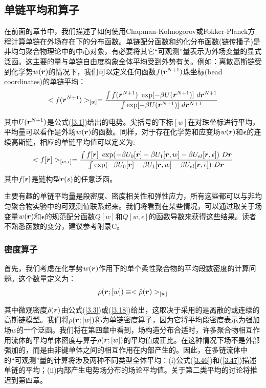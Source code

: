 \subsection{单链平均和算子}
\begin{center}
\author{何志娟}
\end{center}

在前面的章节中，我们描述了如何使用Chapman-Kolmogorov或Fokker-Planck方程计算单链在外场存在下的分布函数。单链配分函数和约化分布函数(链传播子)是非均匀聚合物理论中的中心对象，有必要将其它“可观测”量表示为外场变量的显式泛函。这主要的量与单链自由度构象全体平均受到外势有关。例如：离散高斯链受到化学势$w (\bm{r})$的情况下，我们可以定义任何函数$f(\bm{r}^{N+1})$珠坐标(bead coordinates)的单链平均：
\begin{equation}\label{3.46}
<f(\bm{r}^{N+1})>_{[w]}= \frac{\int  f(\bm{r}^{N+1})~\exp[-\beta U(\bm{r}^{N+1})]~d \bm{r}^{N+1}}{\int \exp[-\beta U(\bm{r}^{N+1})]~d\bm{r}^{N+1}}
\end{equation}

其中$U(\bm{r}^{N+1})$是公式(\ref{3.1})给出的电势。尖括号的下标$[w]$在对珠坐标进行平均，平均量可以看作是外场$w(\bm{r})$的函数。同样，对于存在化学势和应变场$w(\bm{r})$和$\mathbf{\epsilon}$的连续高斯链，相应的单链平均值可以定义为:
\begin{equation}\label{3.47}
<f[\bm{r}]>_{[w ,\epsilon]}=\frac{\int f[\bm{r}]~\exp(-\beta U_{0}[\bm{r}]-\beta U_{1}[\bm{r},w]-\beta U_{el}[\bm{r},\epsilon])~D\bm{r}}{\int \exp(-\beta U_{0}[\bm{r}]-\beta U_{1}[\bm{r},w]-\beta U_{el}[\bm{r},\epsilon])~D\bm{r}}
\end{equation}
其中$f[\bm{r}]$是链构型$\bm{r}(s)$的任意泛函。

主要有趣的单链平均量是段密度、密度相关性和弹性应力，所有这些都可以与非均匀聚合物实验中的可观测值联系起来。我们将看到在某些情况，可以通过取关于场变量$w(\bm{r})$和$\mathbf{\epsilon}$的规范配分函数$Q[w]$和$Q[w,\epsilon]$的函数导数来获得这些结果。读者不熟悉函数的变分，建议参考附录C。
\subsubsection{密度算子}
首先，我们考虑在化学势$w(\bm{r})$作用下的单个柔性聚合物的平均段数密度的计算问题。这个数量定义为：
\begin{equation}\label{3.48}
\rho(\bm{r};[w])\equiv<\tilde{\rho}(\bm{r})>_{[w]}
\end{equation}

其中微观密度$\tilde{\rho}(\bm{r})$由公式(\ref{3.3})或(\ref{3.18})给出，这取决于采用的是离散的或连续的高斯链模型。我们将$\rho(\bm{r};[w])$称为单链密度算子，因为它将平均段密度表示为强加场$w$的一个泛函。我们将在第四章中看到，场构造分布合适时，许多聚合物相互作用流体的平均单体密度与算子$\rho(\bm{r};[w])$的平均值成正比。在这种情况下场不是外部强加的，而是由非键单体之间的相互作用在内部产生的。因此，在多链流体中的“可观测”量的计算将涉及两种不同类型全体平均：(i)公式(\ref{3.46})和(\ref{3.47})描述单链的平均；(ii)内部产生电势场分布的场论平均值。关于第二类平均的讨论将推迟到第四章。


